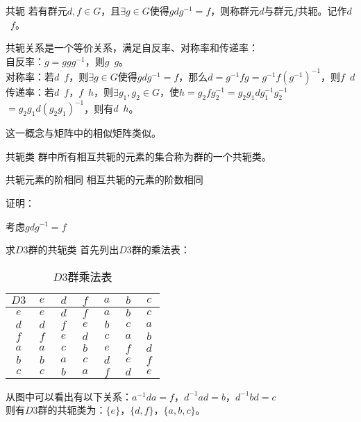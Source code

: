
\begin{issues}
\issueDraft
\end{issues}
\begin{definition}{共轭}
若有群元$d,f\in G$，且$\exists g\in G$使得$gdg^{-1}=f$，则称群元$d$与群元$f$共轭。记作$d$~$f$。
\end{definition}

共轭关系是一个等价关系，满足自反率、对称率和传递率：\\
自反率：$g=ggg^{-1}$，则$g$~$g$。 \\
对称率：若$d$~$f$，则$\exists g\in G$使得$gdg^{-1}=f$，那么$d=g^{-1}fg=
g^{-1}f(g^{-1})^{-1}$，则$f$~$d$ \\
传递率：若$d$~$f$，$f$~$h$，则$\exists g_1,g_2\in G$，使$h=g_2fg_2^{-1}=
g_2g_1dg_1^{-1}g_2^{-1}$ $=g_2g_1d(g_2g_1)^{-1}$，则有$d$~$h$。

这一概念与矩阵中的相似矩阵类似。

\begin{definition}{共轭类}
群中所有相互共轭的元素的集合称为群的一个共轭类。
\end{definition}

\begin{corollary}{共轭元素的阶相同}
相互共轭的元素的阶数相同
\end{corollary}
证明： 

考虑$gdg^{-1}=f$

\begin{example}{求$D3$群的共轭类}
首先列出$D3$群的乘法表：
\begin{table}[ht]
\centering
\caption{$D3$群乘法表}\label{gpcon_tab1}
\begin{tabular}{|c|c|c|c|c|c|c|}
\hline
        $D3$ & $~e~$ & $~d~$ & $~f~$ & $~a~$ & $~b~$ & $~c~$ \\ \hline
        $e$ & $e$ & $d$ & $f$ & $a$ & $b$ & $c$ \\ \hline
        $d$ & $d$ & $f$ & $e$ & $b$ & $c$ & $a$ \\ \hline
        $f$ & $f$ & $e$ & $d$ & $c$ & $a$ & $b$ \\ \hline
        $a$ & $a$ & $c$ & $b$ & $e$ & $f$ & $d$ \\ \hline
        $b$ & $b$ & $a$ & $c$ & $d$ & $e$ & $f$ \\ \hline
        $c$ & $c$ & $b$ & $a$ & $f$ & $d$ & $e$ \\ \hline
\end{tabular}
\end{table}

从图中可以看出有以下关系：$a^{-1}da=f$，$d^{-1}ad=b$，$d^{-1}bd=c$\\
则有$D3$群的共轭类为：$\{e\}$，$\{d,f\}$，$\{a,b,c\}$。
\end{example}